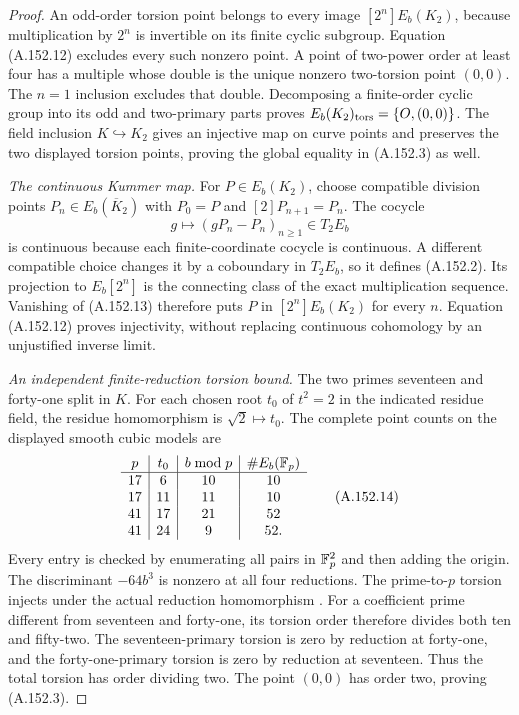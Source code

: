 \begin{proof}
An odd-order torsion point belongs to every image
\([2^n]E_b(K_2)\), because multiplication by \(2^n\)
is invertible on its finite cyclic subgroup.  Equation
(A.152.12) excludes every such nonzero point.
A point of two-power order at least four has a multiple
whose double is the unique nonzero two-torsion point
\((0,0)\).  The \(n=1\) inclusion excludes that double.
Decomposing a finite-order cyclic group into its odd and
two-primary parts proves \(E_b(K_2)_{\rm tors}=\{O,(0,0)\}\).
The field inclusion \(K\hookrightarrow K_2\) gives an
injective map on curve points and preserves the two
displayed torsion points, proving the global equality
in (A.152.3) as well.

\emph{The continuous Kummer map.}
For \(P\in E_b(K_2)\), choose compatible division points
\(P_n\in E_b(\overline K_2)\) with \(P_0=P\) and
\([2]P_{n+1}=P_n\).
The cocycle
\[
            g\longmapsto(gP_n-P_n)_{n\geq1}\in T_2E_b
\tag{A.152.13}
\]
is continuous because each finite-coordinate cocycle is
continuous.  A different compatible choice changes it by
a coboundary in \(T_2E_b\), so it defines (A.152.2).
Its projection to \(E_b[2^n]\) is the connecting class of
the exact multiplication sequence.
Vanishing of (A.152.13) therefore puts \(P\) in
\([2^n]E_b(K_2)\) for every \(n\).
Equation (A.152.12) proves injectivity, without replacing
continuous cohomology by an unjustified inverse limit.

\emph{An independent finite-reduction torsion bound.}
The two primes seventeen and forty-one split in \(K\).
For each chosen root \(t_0\) of \(t^2=2\) in the
indicated residue field, the residue homomorphism is
\(\sqrt2\mapsto t_0\).
The complete point counts on the displayed smooth cubic
models are
\[
 \begin{array}{c|c|c|c}
 p&t_0&b\bmod p&\#E_b(\mathbb F_p)\\\hline
 17&6&10&10\\
 17&11&11&10\\
 41&17&21&52\\
 41&24&9&52.
 \end{array}
\tag{A.152.14}
\]
Every entry is checked by enumerating all pairs in
\(\mathbb F_p^2\) and then adding the origin.  The discriminant
\(-64b^3\) is nonzero at all four reductions.
The prime-to-\(p\) torsion injects under the actual
reduction homomorphism
\cite[II, Corollary 4.2(b) and Remark 4.3]{AgentMilneEC2021}.
For a coefficient prime different from seventeen and
forty-one, its torsion order therefore divides both ten
and fifty-two.
The seventeen-primary torsion is zero by reduction at
forty-one, and the forty-one-primary torsion is zero by
reduction at seventeen.
Thus the total torsion has order dividing two.
The point \((0,0)\) has order two, proving (A.152.3).


\end{proof}
